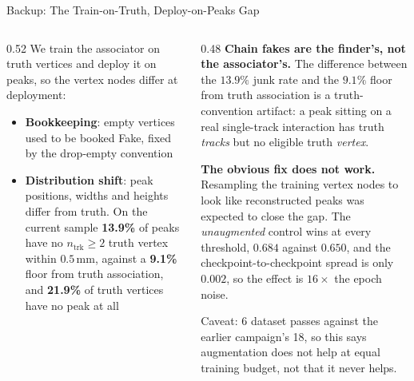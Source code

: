 \documentclass[xcolor=table,aspectratio=169]{beamer}
\newcommand{\ntrk}{\ensuremath{n_\mathrm{trk}}}
\begin{document}
\begin{frame}{Backup: The Train-on-Truth, Deploy-on-Peaks Gap}
    \small
    \begin{columns}[t]
        \begin{column}{0.52\linewidth}
            We train the associator on truth vertices and deploy it on peaks, so the
            vertex nodes differ at deployment:
            \begin{itemize}
                \setlength\itemsep{0.35em}
                \item \textbf{Bookkeeping}: empty vertices used to be booked Fake,
                    fixed by the drop-empty convention
                \item \textbf{Distribution shift}: peak positions, widths and heights
                    differ from truth. On the current sample \textbf{13.9\%} of peaks
                    have no $\ntrk\geq2$ truth vertex within $0.5$\,mm, against a
                    \textbf{9.1\%} floor from truth association, and \textbf{21.9\%} of truth vertices
                    have no peak at all
            \end{itemize}
        \end{column}
        \begin{column}{0.48\linewidth}
            \textbf{Chain fakes are the finder's, not the associator's.} The difference
            between the $13.9\%$ junk rate and the $9.1\%$ floor from truth association is a
            truth-convention artifact: a peak sitting on a real single-track interaction
            has truth \emph{tracks} but no eligible truth \emph{vertex}.
            \vspace{0.6em}

            \vspace{0.2em}
            \textbf{The obvious fix does not work.} Resampling the training vertex nodes
            to look like reconstructed peaks was expected to close the gap. The
            \emph{unaugmented} control wins at every threshold, $0.684$ against $0.650$,
            and the checkpoint-to-checkpoint spread is only $0.002$, so the effect is
            $16\times$ the epoch noise.
            \vspace{0.5em}

            {\footnotesize\textcolor{black!55}{Caveat: 6 dataset passes against the
            earlier campaign's 18, so this says augmentation does not help at equal
            training budget, not that it never helps.}}
        \end{column}
    \end{columns}
\end{frame}
\end{document}
